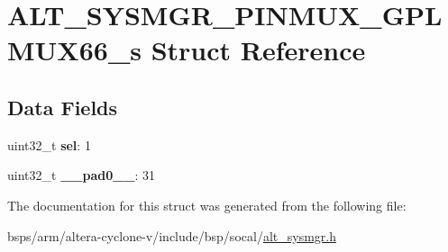 \hypertarget{structALT__SYSMGR__PINMUX__GPLMUX66__s}{}\section{A\+L\+T\+\_\+\+S\+Y\+S\+M\+G\+R\+\_\+\+P\+I\+N\+M\+U\+X\+\_\+\+G\+P\+L\+M\+U\+X66\+\_\+s Struct Reference}
\label{structALT__SYSMGR__PINMUX__GPLMUX66__s}
\subsection*{Data Fields}
\begin{DoxyCompactItemize}
\item 
\mbox{\label{structALT__SYSMGR__PINMUX__GPLMUX66__s_afc8972285b417a7ef239557c2df3f01b}} 
uint32\+\_\+t {\bfseries sel}\+: 1
\item 
\mbox{\label{structALT__SYSMGR__PINMUX__GPLMUX66__s_a59da451386f396ec6f121816e9f4c9bb}} 
uint32\+\_\+t {\bfseries \+\_\+\+\_\+pad0\+\_\+\+\_\+}\+: 31
\end{DoxyCompactItemize}


The documentation for this struct was generated from the following file\+:\begin{DoxyCompactItemize}
\item 
bsps/arm/altera-\/cyclone-\/v/include/bsp/socal/\mbox{\hyperlink{alt__sysmgr_8h}{alt\+\_\+sysmgr.\+h}}\end{DoxyCompactItemize}
